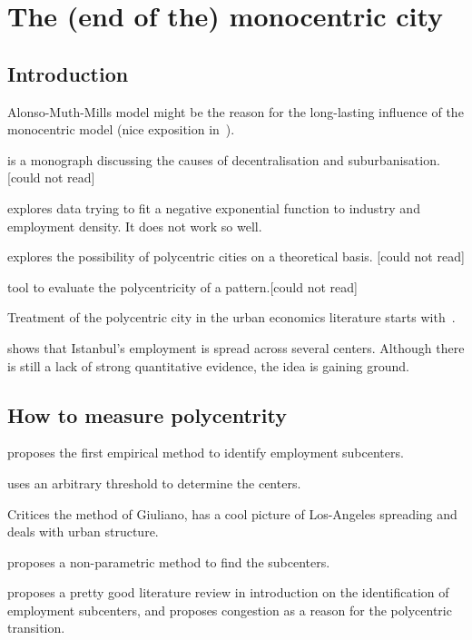 %
\chapter{The (end of the) monocentric city}
\label{sec:related}


\section{Introduction}
\label{sec:introduction}

Alonso-Muth-Mills model might be the reason for the long-lasting influence of
the monocentric model (nice exposition in~\cite{Fujita:1989}).

\cite{Mills:1972} is a monograph discussing the causes of decentralisation and
suburbanisation. [could not read]

\cite{Kemper:1974} explores data trying to fit a negative exponential function
to industry and employment density. It does not work so well.

\cite{Odland:1978} explores the possibility of polycentric cities on a
theoretical basis. [could not read]

\cite{Griffith:1981} tool to evaluate the polycentricity of a pattern.[could not
read]

Treatment of the polycentric city in the urban economics literature starts
with~\cite{Fujita:1982}.

\cite{Dokmeci:1994} shows that Istanbul's employment is spread across several
centers. Although there is still a lack of strong quantitative evidence, the
idea is gaining ground.



\section{How to measure polycentrity}
\label{sec:how_to_measure_polycentrity}

\cite{McDonald:1987} proposes the first empirical method to identify employment
subcenters.

\cite{Giuliano:1991} uses an arbitrary threshold to determine the centers.

\cite{Anas:1998} Critices the method of Giuliano, has a cool picture of
Los-Angeles spreading and deals with urban structure.

\cite{McMillen:2001} proposes a non-parametric method to find the subcenters.

\cite{McMillen:2003} proposes a pretty good literature review in introduction on
the identification of employment subcenters, and proposes congestion as a reason
for the polycentric transition.

